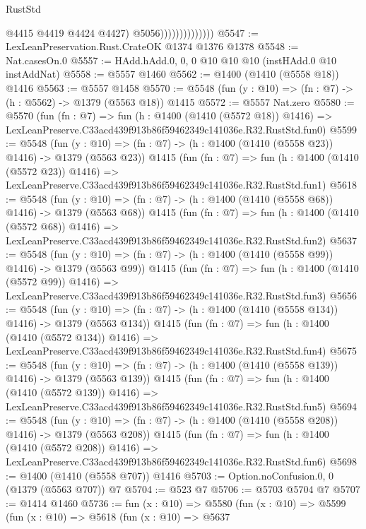\begin{lexlean}{RustStd}
\begin{coremodule}
                                  @4415
                                  @4419
                                  @4424
                                  @4427)
                                @5056))))))))))))))
@5547 := LexLeanPreservation.Rust.CrateOK @1374 @1376 @1378
@5548 := Nat.casesOn.{0}
@5557 := HAdd.hAdd.{0, 0, 0} @10 @10 @10 (instHAdd.{0} @10 instAddNat)
@5558 := @5557 @1460
@5562 := @1400 (@1410 (@5558 @18)) @1416
@5563 := @5557 @1458
@5570 := @5548 (fun (y : @10) => (fn : @7) -> (h : @5562) -> @1379 (@5563 @18)) @1415
@5572 := @5557 Nat.zero
@5580 := @5570
    (fun (fn : @7) =>
    fun (h : @1400 (@1410 (@5572 @18)) @1416) =>
    LexLeanPreserve.C33acd439f913b86f59462349c141036e.R32.RustStd.fun0)
@5599 := @5548
    (fun (y : @10) => (fn : @7) -> (h : @1400 (@1410 (@5558 @23)) @1416) -> @1379 (@5563 @23))
    @1415
    (fun (fn : @7) =>
    fun (h : @1400 (@1410 (@5572 @23)) @1416) =>
    LexLeanPreserve.C33acd439f913b86f59462349c141036e.R32.RustStd.fun1)
@5618 := @5548
    (fun (y : @10) => (fn : @7) -> (h : @1400 (@1410 (@5558 @68)) @1416) -> @1379 (@5563 @68))
    @1415
    (fun (fn : @7) =>
    fun (h : @1400 (@1410 (@5572 @68)) @1416) =>
    LexLeanPreserve.C33acd439f913b86f59462349c141036e.R32.RustStd.fun2)
@5637 := @5548
    (fun (y : @10) => (fn : @7) -> (h : @1400 (@1410 (@5558 @99)) @1416) -> @1379 (@5563 @99))
    @1415
    (fun (fn : @7) =>
    fun (h : @1400 (@1410 (@5572 @99)) @1416) =>
    LexLeanPreserve.C33acd439f913b86f59462349c141036e.R32.RustStd.fun3)
@5656 := @5548
    (fun (y : @10) => (fn : @7) -> (h : @1400 (@1410 (@5558 @134)) @1416) -> @1379 (@5563 @134))
    @1415
    (fun (fn : @7) =>
    fun (h : @1400 (@1410 (@5572 @134)) @1416) =>
    LexLeanPreserve.C33acd439f913b86f59462349c141036e.R32.RustStd.fun4)
@5675 := @5548
    (fun (y : @10) => (fn : @7) -> (h : @1400 (@1410 (@5558 @139)) @1416) -> @1379 (@5563 @139))
    @1415
    (fun (fn : @7) =>
    fun (h : @1400 (@1410 (@5572 @139)) @1416) =>
    LexLeanPreserve.C33acd439f913b86f59462349c141036e.R32.RustStd.fun5)
@5694 := @5548
    (fun (y : @10) => (fn : @7) -> (h : @1400 (@1410 (@5558 @208)) @1416) -> @1379 (@5563 @208))
    @1415
    (fun (fn : @7) =>
    fun (h : @1400 (@1410 (@5572 @208)) @1416) =>
    LexLeanPreserve.C33acd439f913b86f59462349c141036e.R32.RustStd.fun6)
@5698 := @1400 (@1410 (@5558 @707)) @1416
@5703 := Option.noConfusion.{0, 0} (@1379 (@5563 @707)) @7
@5704 := @523 @7
@5706 := @5703 @5704 @7
@5707 := @1414 @1460
@5736 := fun (x : @10) =>
  @5580
    (fun (x : @10) =>
    @5599
      (fun (x : @10) =>
      @5618
        (fun (x : @10) =>
        @5637

\end{coremodule}
\end{lexlean}

